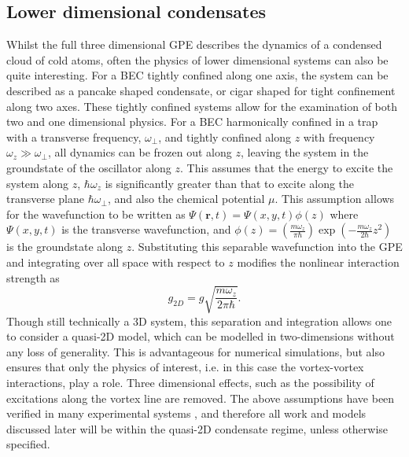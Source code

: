 \subsection{Lower dimensional condensates}\label{sub:coldatom_recent}
Whilst the full three dimensional GPE describes the dynamics of a condensed cloud of cold atoms, often the physics of lower dimensional systems can also be quite interesting. For a BEC tightly confined along one axis, the system can be described as a pancake shaped condensate, or cigar shaped for tight confinement along two axes. These tightly confined systems allow for the examination of both two and one dimensional physics. For a BEC harmonically confined in a trap with a transverse frequency, $\omega_\perp$, and tightly confined along $z$ with frequency $\omega_z \gg \omega_\perp$, all dynamics can be frozen out along $z$, leaving the system in the groundstate of the oscillator along $z$. This assumes that the energy to excite the system along $z$, $\hbar\omega_z$ is significantly greater than that to excite along the transverse plane $\hbar\omega_\perp$, and also the chemical potential $\mu$. This assumption allows for the wavefunction to be written as $\Psi(\mathbf{r},t) = \Psi(x,y,t)\phi(z)$ where $\Psi(x,y,t)$ is the transverse wavefunction, and $\phi(z) = \left(\frac{m\omega_z}{\pi\hbar}\right)\exp\left(-\frac{m\omega_z}{2\hbar}z^2\right)$ is the groundstate along $z$.
Substituting this separable wavefunction into the GPE and integrating over all space with respect to $z$ modifies the nonlinear interaction strength as~\cite{BK:Pethick_Smith_2008}
\begin{equation}\label{eqn:g2d_efint}
    g_{2D} = g\sqrt{\frac{m\omega_z}{2\pi\hbar}}.
\end{equation}
Though still technically a 3D system, this separation and integration allows one to consider a quasi-2D model, which can be modelled in two-dimensions without any loss of generality. This is advantageous for numerical simulations, but also ensures that only the physics of interest, i.e. in this case the vortex-vortex interactions, play a role. Three dimensional effects, such as the possibility of excitations along the vortex line are removed. The above assumptions have been verified in many experimental systems \cite{BEC:Gorlitz_prl_2001,BEC:Stock_prl_2005,Vtx:Neely_prl_2010,VTX:Kwon_pra_2014,BEC:Seo_jkps_2014,BEC:Chomaz_natcom_2015}, and therefore all work and models discussed later will be within the quasi-2D condensate regime, unless otherwise specified.
